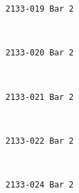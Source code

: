 \documentclass[11pt]{article}
\begin{document}
    \begin{Verbatim}[commandchars=\\\{\}]
2133-019 Bar 2

    \end{Verbatim}

    \begin{center}
    \end{center}
    { \hspace*{\fill} \\}
    
    \begin{Verbatim}[commandchars=\\\{\}]
2133-020 Bar 2

    \end{Verbatim}

    \begin{center}
    \end{center}
    { \hspace*{\fill} \\}
    
    \begin{Verbatim}[commandchars=\\\{\}]
2133-021 Bar 2

    \end{Verbatim}

    \begin{center}
    \end{center}
    { \hspace*{\fill} \\}
    
    \begin{Verbatim}[commandchars=\\\{\}]
2133-022 Bar 2

    \end{Verbatim}

    \begin{center}
    \end{center}
    { \hspace*{\fill} \\}
    
    \begin{Verbatim}[commandchars=\\\{\}]
2133-024 Bar 2

    \end{Verbatim}
\end{document}
